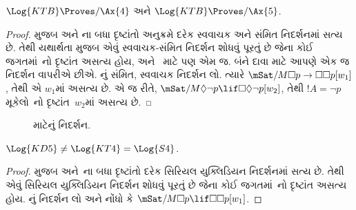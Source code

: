 \begin{thm}
  $\Log{KTB} \Proves/ \Ax{4}$ અને $\Log{KTB} \Proves/ \Ax{5}$.
\end{thm}

\begin{proof}
   મુજબ  અને ના બધા
  દૃષ્ટાંતો અનુક્રમે દરેક સ્વવાચક અને સંમિત નિદર્શનમાં સત્ય છે. તેથી
  યથાર્થતા મુજબ એવું સ્વવાચક-સંમિત નિદર્શન શોધવું પૂરતું છે જેના કોઈ
  જગતમાં~નો દૃષ્ટાંત અસત્ય હોય, અને~ માટે પણ એમ જ. બંને
  દાવા માટે આપણે એક જ નિદર્શન વાપરીએ છીએ.
  નું સંમિત, સ્વવાચક નિદર્શન લો. ત્યારે
  $\mSat/{M}{\Box p \to \Box \Box
    p}[w_1]$, તેથી  એ $w_1$માં અસત્ય છે. એ જ રીતે,
  $\mSat/{M}{\Diamond
    \lnot p \lif \Box \Diamond \lnot p}[w_2]$, તેથી $!A = \lnot p$
  મૂકેલો~નો દૃષ્ટાંત~$w_2$માં અસત્ય છે.
\end{proof}

\begin{figure}[htpb]
  \centering
  \caption{ માટેનું નિદર્શન.}
\end{figure}

\begin{thm}
  $\Log{KD5} \neq \Log{KT4} = \Log{S4}$.
\end{thm}

\begin{proof}
   મુજબ  અને~ના બધા
  દૃષ્ટાંતો દરેક સિરિયલ યુક્લિડિયન નિદર્શનમાં સત્ય છે. તેથી એવું
  સિરિયલ યુક્લિડિયન નિદર્શન શોધવું પૂરતું છે જેના કોઈ જગતમાં~નો
  દૃષ્ટાંત અસત્ય હોય. નું નિદર્શન લો અને નોંધો કે
  $\mSat/{M}{\Box p
  \lif \Box\Box p}[w_1]$.
\end{proof}

